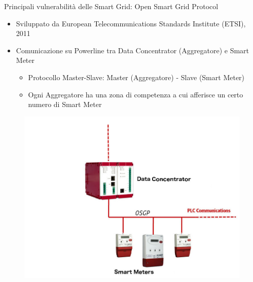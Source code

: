 \begin{frame}{Principali vulnerabilità delle Smart Grid: Open Smart Grid Protocol}
	\begin{itemize}[<+- | alert@+>]
		\item Sviluppato da European Telecommunications Standards Institute (ETSI), 2011
		\item Comunicazione su Powerline tra Data Concentrator (Aggregatore) e Smart Meter
		\begin{itemize}
			\item Protocollo Master-Slave: Master (Aggregatore) - Slave (Smart Meter)
			\item Ogni Aggregatore ha una zona di competenza a cui afferisce un certo numero di Smart Meter
		\end{itemize}
	\end{itemize}
	\begin{figure}[h]
		\includegraphics[scale=0.15,cfbox=blue_slides 1pt 0pt]{imgs/aggregator.jpg}
	\end{figure}
\end{frame}

